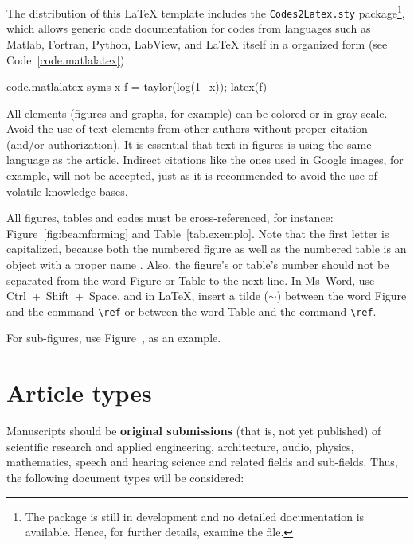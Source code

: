 \documentclass[12pt, a4paper, twoside, twocolumn]{article}
\begin{document}
The distribution of this \LaTeX\xspace template includes the \texttt{Codes2Latex.sty} package\footnote{The package is still in development  and no detailed documentation is available. Hence, for further details, examine the  file.}, which allows generic code documentation for codes from languages such as Matlab, Fortran, Python, LabView, and \LaTeX{} itself  in a organized form (see Code~\ref{code.matlalatex})

\begin{matlabcode}{code.matlalatex}
  syms x
  f = taylor(log(1+x));
  latex(f)
\end{matlabcode}

All elements (figures and graphs, for example) can be colored or in gray scale. Avoid the use of text elements from other authors without proper citation (and/or authorization). It is essential that text in figures is using the same language as the article. Indirect citations like the ones used in Google images, for example, will not be accepted, just as it is recommended to avoid the use of volatile knowledge bases.

All figures, tables and codes must be cross-referenced, for instance: Figure~\ref{fig:beamforming} and Table~\ref{tab.exemplo}. Note that the first letter is capitalized, because both the numbered figure as well as the numbered table is an object with a proper name . Also, the figure's or table's number should not be separated from the word Figure or Table to the next line. In Ms~Word, use Ctrl~+~Shift~+~Space, and in \LaTeX, insert a tilde ($\sim$) between the word Figure and the command \verb=\ref= or between the word Table and the command \verb=\ref=.

For sub-figures, use Figure~, as an example.

\section{Article types}

Manuscripts should be \textbf{original submissions} (that is, not yet published) of scientific research and applied engineering, architecture, audio, physics, mathematics, speech and hearing science and related fields and sub-fields. Thus, the following document types will be considered:
\end{document}
